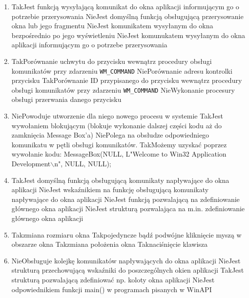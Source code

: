 \begin{enumerate}
	\newpage

	\item {}
	{Tak}{Jest funkcją wysyłającą komunikat do okna aplikacji informującym go o potrzebie przerysowania}
	{Nie}{Jest domyślną funkcją obsługującą przerysowanie okna lub jego fragmentu}
	{Nie}{Jest komunikatem wysyłanym do okna bezpośrednio po jego wyświetleniu}
	{Nie}{Jest komunukatem wysyłanym do okna aplikacji informującym go o potrzebe przerysowania}
	
	\item {}
	{Tak}{Porównanie uchwytu do przycisku wewnątrz procedury obsługi komunikatów przy zdarzeniu \texttt{WM\_COMMAND}}
	{Nie}{Porównanie adresu kontrolki przycisku}
	{Tak}{Porównanie ID przypisanego do przycisku wewnątrz procedury obsługi komunikatów przy zdarzeniu \texttt{WM\_COMMAND}}
	{Nie}{Wykonanie procesury obsługi przerwania danego przycisku}
	
	\item {}
	{Nie}{Powoduje utworzenie dla niego nowego procesu w systemie}
	{Tak}{Jest wywołaniem blokującym (blokuje wykonanie dalszej części kodu aż do zamknięcia Message Box'a)}
	{Nie}{Polega na obsłudze odpowiedniego komunikatu w pętli obsługi komunikatów.}
	{Tak}{Możemy uzyskać poprzez wywołanie kodu: MessageBox(NULL, L"Welcome to Win32 Application Development$\backslash$n", NULL, NULL);}
	
	\item {}
	{Tak}{Jest domyślną funkcją obsługującą komunikaty napływające do okna aplikacji}
	{Nie}{Jest wskaźnikiem na funkcję obsługującą komunikaty napływające do okna aplikacji}
	{Nie}{Jest funkcją pozwalającą na zdefiniowanie głównego okna aplikacji}
	{Nie}{Jest strukturą pozwalająca na m.in. zdefiniowanie głównego okna aplikacji}

	\item {}
	{Tak}{zmiana rozmiaru okna}
	{Tak}{pojedyncze bądź podwójne kliknięcie myszą w obszarze okna}
	{Tak}{zmiana położenia okna}
	{Tak}{naciśnięcie klawisza}
	
	\item {}
	{Nie}{Obsługuje kolejkę komunikatów napływających do okna aplikacji}
	{Nie}{Jest strukturą przechowującą wskaźniki do poszczególnych okien aplikacji}
	{Tak}{Jest strukturą pozwalającą zdefiniować np. koloty okna aplikacji}
	{Nie}{Jest odpowiednikiem funkcji main() w programach pisanych w WinAPI}
	
\end{enumerate}